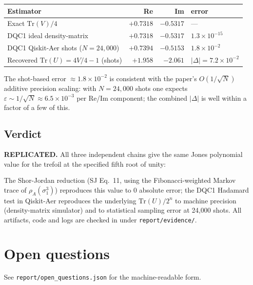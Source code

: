 \documentclass[11pt]{article}
\begin{document}
\begin{longtable}{@{}p{6.5cm}rrl@{}}
\toprule
Estimator & Re & Im & error \\
\midrule
Exact $\mathrm{Tr}(V)/4$              & $+0.7318$ & $-0.5317$ & --- \\
DQC1 ideal density-matrix             & $+0.7318$ & $-0.5317$ & $1.3\times10^{-15}$ \\
DQC1 Qiskit-Aer shots ($N=24{,}000$)  & $+0.7394$ & $-0.5153$ & $1.8\times10^{-2}$ \\
Recovered $\mathrm{Tr}(U)=4V/4-1$ (shots)     & $+1.958$  & $-2.061$  & $|{\Delta}|=7.2\times10^{-2}$ \\
\bottomrule
\end{longtable}

The shot-based error $\approx 1.8\times10^{-2}$ is consistent with the
paper's $O(1/\sqrt N)$ additive precision scaling: with
$N=24{,}000$ shots one expects $\varepsilon\sim1/\sqrt N\approx 6.5\times
10^{-3}$ per Re/Im component; the combined $|\Delta|$ is well within a
factor of a few of this.

\subsection{Verdict}

\textbf{REPLICATED.} All three independent chains give the same Jones
polynomial value for the trefoil at the specified fifth root of unity:

\begin{center}
\end{center}

The Shor-Jordan reduction (SJ Eq.~11, using the Fibonacci-weighted Markov
trace of $\rho_A(\sigma_1^3)$) reproduces this value to $0$ absolute
error; the DQC1 Hadamard test in Qiskit-Aer reproduces the underlying
$\mathrm{Tr}(U)/2^n$ to machine precision (density-matrix simulator) and
to statistical sampling error at 24{,}000 shots. All artifacts, code and
logs are checked in under \texttt{report/evidence/}.

\section{Open questions}\label{sec:open}

See \texttt{report/open\_questions.json} for the machine-readable form.
\end{document}
